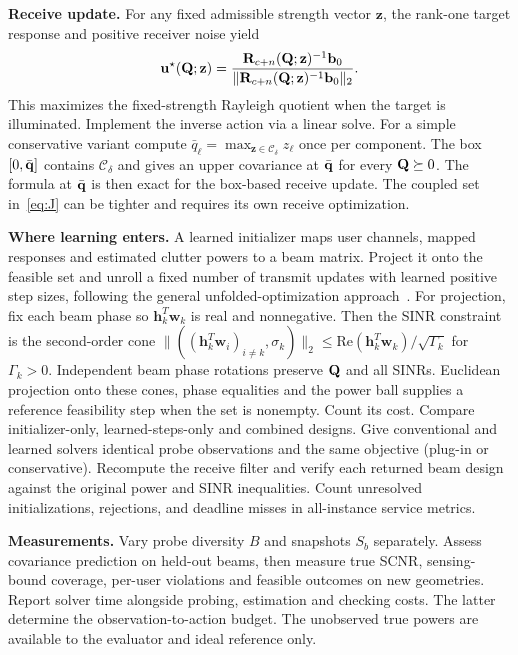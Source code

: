 \textbf{Receive update.} For any fixed admissible strength vector $\mathbf z$, the rank-one target response and positive receiver noise yield
\begin{equation}
 \mathbf u^\star(\mathbf Q;\mathbf z)=
 \frac{\mathbf R_{c+n}(\mathbf Q;\mathbf z)^{-1}\mathbf b_0}
 {\|\mathbf R_{c+n}(\mathbf Q;\mathbf z)^{-1}\mathbf b_0\|_2}.
\end{equation}
This maximizes the fixed-strength Rayleigh quotient when the target is illuminated. Implement the inverse action via a linear solve. For a simple conservative variant compute $\bar q_\ell=\max_{\mathbf z\in\mathcal C_\delta}z_\ell$ once per component. The box $[0,\bar{\mathbf q}]$ contains $\mathcal C_\delta$ and gives an upper covariance at $\bar{\mathbf q}$ for every $\mathbf Q\succeq0$. The formula at $\bar{\mathbf q}$ is then exact for the box-based receive update. The coupled set in~\eqref{eq:J} can be tighter and requires its own receive optimization.

\textbf{Where learning enters.} A learned initializer maps user channels, mapped responses and estimated clutter powers to a beam matrix. Project it onto the feasible set and unroll a fixed number of transmit updates with learned positive step sizes, following the general unfolded-optimization approach~\cite{nguyen2024hybrid}. For projection, fix each beam phase so $\mathbf h_k^T\mathbf w_k$ is real and nonnegative. Then the SINR constraint is the second-order cone $\|((\mathbf h_k^T\mathbf w_i)_{i\ne k},\sigma_k)\|_2\leq \mathrm{Re}(\mathbf h_k^T\mathbf w_k)/\sqrt{\Gamma_k}$ for $\Gamma_k>0$. Independent beam phase rotations preserve $\mathbf Q$ and all SINRs. Euclidean projection onto these cones, phase equalities and the power ball supplies a reference feasibility step when the set is nonempty. Count its cost. Compare initializer-only, learned-steps-only and combined designs. Give conventional and learned solvers identical probe observations and the same objective (plug-in or conservative). Recompute the receive filter and verify each returned beam design against the original power and SINR inequalities. Count unresolved initializations, rejections, and deadline misses in all-instance service metrics.

\textbf{Measurements.} Vary probe diversity $B$ and snapshots $S_b$ separately. Assess covariance prediction on held-out beams, then measure true SCNR, sensing-bound coverage, per-user violations and feasible outcomes on new geometries. Report solver time alongside probing, estimation and checking costs. The latter determine the observation-to-action budget. The unobserved true powers are available to the evaluator and ideal reference only.

\small

